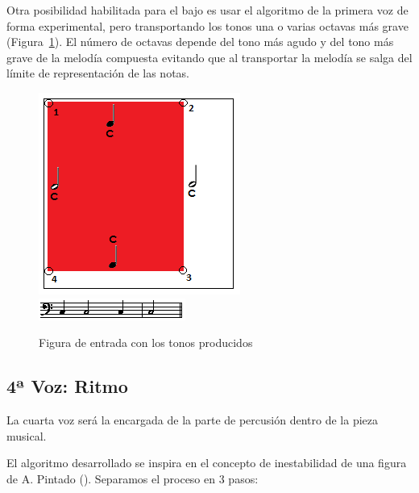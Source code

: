 Otra posibilidad habilitada para el bajo es usar el algoritmo de la primera voz de forma experimental, pero transportando los tonos una o varias octavas más grave (Figura~\ref{fig:Figura2Voz3}). El número de octavas depende del tono más agudo y del tono más grave de la melodía compuesta evitando que al transportar la melodía se salga del límite de representación de las notas.

		\begin{figure}[htbp]
		\centering
		\hspace*{0.0in}
		\includegraphics[scale=1]{graphics/simpletest2-F2F3_2.png}
		\includegraphics[scale=1]{graphics/simpletest3_2-BASSpartitura.png}
		\caption{Figura de entrada con los tonos producidos}
		\label{fig:Figura2Voz3}
		\end{figure}


\subsection{4ª Voz: Ritmo}

La cuarta voz será la encargada de la parte de percusión dentro de la pieza musical.

El algoritmo desarrollado se inspira en el concepto de inestabilidad de una figura de A. Pintado (\cite{portutesis}). Separamos el proceso en 3 pasos:

